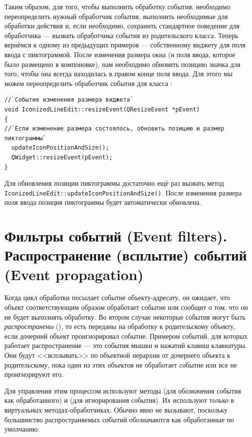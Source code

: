Таким образом, для того, чтобы выполнить обработку события, необходимо переопределить нужный обработчик события,
выполнить необходимые для обработки действия и, если необходимо, сохранить стандартное поведение для обработчика ---
вызвать обработчика события из родительского класса. Теперь вернёмся к одному из предыдущих примеров --- собственному
виджету для поля ввода с пиктограммой. После изменения размера окна (и поля ввода, которое было размещено в
компоновке), нам необходимо обновить позицию значка для того, чтобы она всегда находилась в правом конце поля ввода.
Для этого мы можем переопределить обработчик события  для класса :
\begin{lstlisting}
//`Событие изменения размера виджета`
void IconizedLineEdit::resizeEvent(QResizeEvent *pEvent)
{
//`Если изменение размера состоялось, обновить позицию и размер пиктограммы`
  updateIconPositionAndSize();
  QWidget::resizeEvent(pEvent);
}
\end{lstlisting}

Для обновления позиции пиктограммы достаточно ещё раз вызвать метод
\lstinline!IconizedLineEdit::updateIconPositionAndSize()!. После изменения размера поля ввода позиция пиктограммы будет
автоматически обновлена.

\section[Фильтры событий (Event filters)]{Фильтры событий (Event filters). Распространение (всплытие) событий (Event propagation)}
Когда цикл обработки посылает событие объекту-адресату, он ожидает, что объект соответствующим образом обработает
событие или сообщит о том, что он не будет выполнять обработку. 
Во втором случае некоторые события могут быть \emph{распространены} (), то есть переданы на обработку к родительскому объекту, если дочерний объект проигнорировал событие.
Примером событий, для которых работает распространение --- это
события мышки и нажатий клавиш клавиатуры. Они будут <<всплывать>> по объектной иерархии от дочернего объекта к родительскому, пока один из этих объектов не обработает событие или все не проигнорируют его. 

Для управления этим процессом используют методы 
(для обозначения события как обработанного) и  (для игнорирования события). Их
используют только в виртуальных методах-обработчиках. Обычно  явно не вызывают,
поскольку большинство распространяемых событий обозначаются как обработанные по умолчанию.

